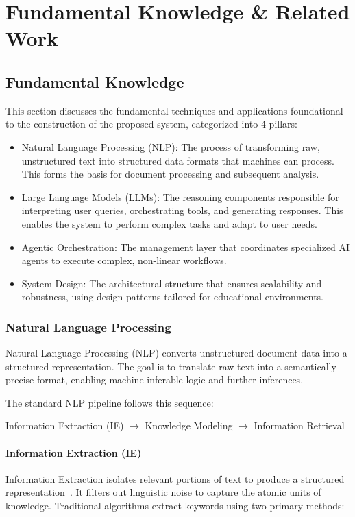 \chapter{Fundamental Knowledge \& Related Work}
\section{Fundamental Knowledge}
This section discusses the fundamental techniques and applications foundational to the construction of the proposed system, categorized into 4 pillars: 
\begin{itemize}
    \item {Natural Language Processing (NLP):} The process of transforming raw, unstructured text into structured data formats that machines can process. This forms the basis for document processing and subsequent analysis.
    \item {Large Language Models (LLMs):} The reasoning components responsible for interpreting user queries, orchestrating tools, and generating responses. This enables the system to perform complex tasks and adapt to user needs.
    \item {Agentic Orchestration:} The management layer that coordinates specialized AI agents to execute complex, non-linear workflows.
    \item {System Design:} The architectural structure that ensures scalability and robustness, using design patterns tailored for educational environments.
\end{itemize}
\subsection{Natural Language Processing}

Natural Language Processing (NLP) converts unstructured document data into a structured representation. The goal is to translate raw text into a semantically precise format, enabling machine-inferable logic and further inferences.

The standard NLP pipeline follows this sequence:
\begin{center}
    {Information Extraction (IE) $\longrightarrow$ Knowledge Modeling $\longrightarrow$ Information Retrieval}
\end{center}

\subsubsection*{Information Extraction (IE)}
Information Extraction isolates relevant portions of text to produce a structured representation~\cite{StanfordNLP}. It filters out linguistic noise to capture the atomic units of knowledge. Traditional algorithms extract keywords using two primary methods:

